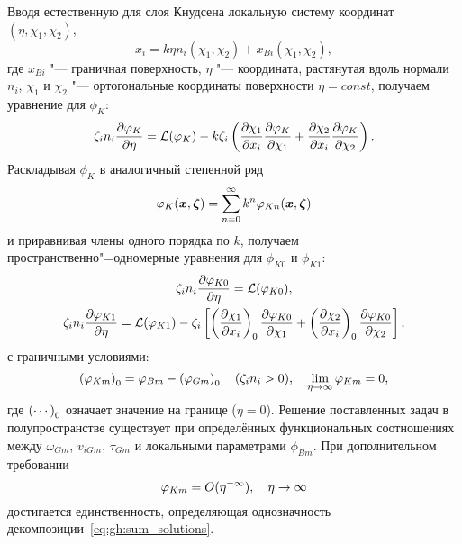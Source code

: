Вводя естественную для слоя Кнудсена локальную систему координат \((\eta,\chi_1,\chi_2)\),
\begin{equation}\label{eq:eta_definition}
    x_i = k\eta n_i(\chi_1,\chi_2) + x_{Bi}(\chi_1,\chi_2),
\end{equation}
где \(x_{Bi}\) "--- граничная поверхность, \(\eta\) "--- координата, растянутая вдоль нормали \(n_i\),
\(\chi_1\) и \(\chi_2\) "--- ортогональные координаты поверхности \(\eta=const\),
получаем уравнение для \(\phi_K\):
\begin{equation}\label{eq:gh:knudsen_equation}
    \zeta_in_i\pder[\phi_K]{\eta} = \mathcal{L}(\phi_K)
    - k\zeta_i\left(\pder[\chi_1]{x_i}\pder[\phi_K]{\chi_1} + \pder[\chi_2]{x_i}\pder[\phi_K]{\chi_2}\right).
\end{equation}
Раскладывая \(\phi_K\) в аналогичный степенной ряд
\begin{equation}\label{eq:gh:phiK_sum}
    \phi_K(\bx,\bzeta) = \sum_{n=0}^\infty k^n \phi_{Kn}(\bx,\bzeta)
\end{equation}
и приравнивая члены одного порядка по \(k\), получаем пространственно"=одномерные уравнения
для \(\phi_{K0}\) и \(\phi_{K1}\):
\begin{gather}
    \zeta_in_i\pder[\phi_{K0}]{\eta} = \mathcal{L}(\phi_{K0}), \label{eq:gh:knlayer0}\\
    \zeta_in_i\pder[\phi_{K1}]{\eta} = \mathcal{L}(\phi_{K1})
        - \zeta_i\left[ \onwall{\pder[\chi_1]{x_i}} \pder[\phi_{K0}]{\chi_1}
            + \onwall{\pder[\chi_2]{x_i}} \pder[\phi_{K0}]{\chi_2}
        \right], \label{eq:gh:knlayer1}
\end{gather}
с граничными условиями:
\begin{equation}\label{eq:gh:phiK_bc}
    \onwall{\phi_{Km}} = \phi_{Bm} - \onwall{\phi_{Gm}} \quad (\zeta_in_i>0),
        \quad \lim_{\eta\to\infty} \phi_{Km} = 0,
\end{equation}
где \(\onwall{\cdots}\) означает значение на границе (\(\eta=0\)).
Решение поставленных задач в полупространстве существует при определённых функциональных соотношениях
между \(\omega_{Gm}\), \(v_{iGm}\), \(\tau_{Gm}\) и локальными параметрами \(\phi_{Bm}\).
При дополнительном требовании
\begin{equation}\label{eq:gh:phiK_exp_decay}
    \phi_{Km} = \OO{\eta^{-\infty}}, \quad \eta\to\infty
\end{equation}
достигается единственность, определяющая однозначность декомпозиции~\eqref{eq:gh:sum_solutions}.

